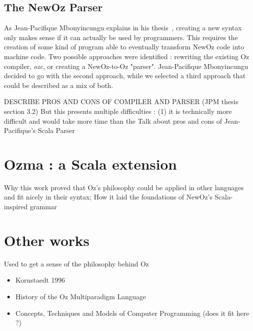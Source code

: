 \subsection{The NewOz Parser}\label{subsec:ch1CurrentParser}
As Jean-Pacifique Mbonyincungu explains in his thesis~\cite{jpthesis}, creating a new syntax only makes sense if it can actually be used by programmers.
This requires the creation of some kind of program able to eventually transform NewOz code into machine code.
Two possible approaches were identified : rewriting the existing Oz compiler, \textit{ozc}, or creating a NewOz-to-Oz "parser".
Jean-Pacifique Mbonyincungu decided to go with the second approach, while we selected a third approach that could be described as a mix of both.

DESCRIBE PROS AND CONS OF COMPILER AND PARSER (JPM thesis section 3.2)
But this presents multiple difficulties : (1) it is technically more difficult and would take more time than the
Talk about pros and cons of Jean-Pacifique's Scala Parser

\section{Ozma : a Scala extension}\label{sec:ch1Ozma}
Why this work proved that Oz's philosophy could be applied in other languages and fit nicely in their syntax;
How it laid the foundations of NewOz's Scala-inspired grammar

\section{Other works}\label{sec:ch1OtherWorks}
Used to get a sense of the philosophy behind Oz
\begin{itemize}
    \item Kornstaedt 1996
    \item History of the Oz Multiparadigm Language
    \item Concepts, Techniques and Models of Computer Programming (does it fit here ?)
\end{itemize}